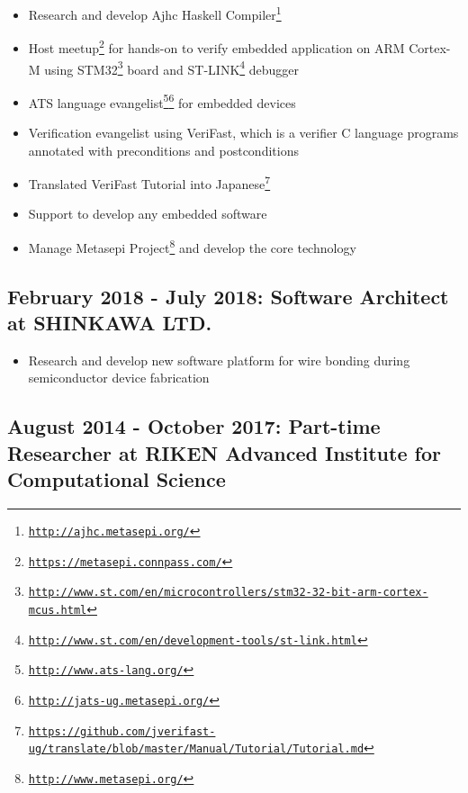 \documentclass[letterpaper]{article}
\begin{document}
\begin{itemize}
  \item Research and develop Ajhc Haskell Compiler\footnote{\href{http://ajhc.metasepi.org/}{\tt http://ajhc.metasepi.org/}}
  \item Host meetup\footnote{\href{https://metasepi.connpass.com/}{\tt https://metasepi.connpass.com/}} for hands-on to verify embedded application on ARM Cortex-M using STM32\footnote{\href{http://www.st.com/en/microcontrollers/stm32-32-bit-arm-cortex-mcus.html}{\tt http://www.st.com/en/microcontrollers/stm32-32-bit-arm-cortex-mcus.html}} board and ST-LINK\footnote{\href{http://www.st.com/en/development-tools/st-link.html}{\tt http://www.st.com/en/development-tools/st-link.html}} debugger
  \item ATS language evangelist\footnote{\href{http://www.ats-lang.org/}{\tt http://www.ats-lang.org/}}\footnote{\href{http://jats-ug.metasepi.org/}{\tt http://jats-ug.metasepi.org/}} for embedded devices
  \item Verification evangelist using VeriFast, which is a verifier C language programs annotated with preconditions and postconditions
  \item Translated VeriFast Tutorial into Japanese\footnote{\href{https://github.com/jverifast-ug/translate/blob/master/Manual/Tutorial/Tutorial.md}{\tt https://github.com/jverifast-ug/translate/blob/master/Manual/Tutorial/Tutorial.md}}
  \item Support to develop any embedded software
  \item Manage Metasepi Project\footnote{\href{http://www.metasepi.org/}{\tt http://www.metasepi.org/}} and develop the core technology
\end{itemize}

\subsection*{February 2018 - July 2018: Software Architect at SHINKAWA LTD.}

\begin{itemize}
  \item Research and develop new software platform for wire bonding during semiconductor device fabrication
\end{itemize}

\subsection*{August 2014 - October 2017: Part-time Researcher at RIKEN Advanced Institute for Computational Science}
\end{document}
